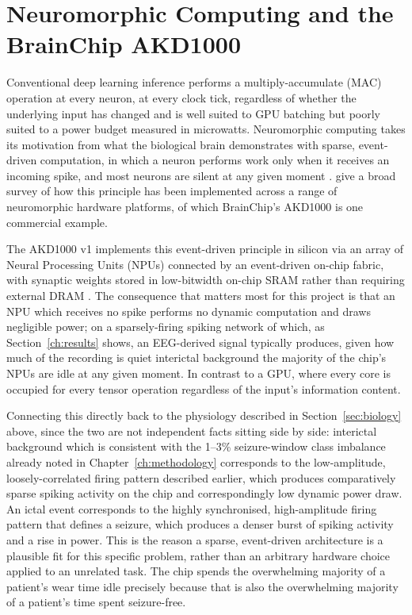 \section{Neuromorphic Computing and the BrainChip AKD1000}

Conventional deep learning inference performs a multiply-accumulate (MAC) operation at every neuron, at every clock tick, regardless of whether the underlying input has changed and is well suited to GPU batching but poorly suited to a power budget measured in microwatts. Neuromorphic computing takes its motivation from what the biological brain demonstrates with sparse, event-driven computation, in which a neuron performs work only when it receives an incoming spike, and most neurons are silent at any given moment \citep{mead1990}. \citet{schuman2017} give a broad survey of how this principle has been implemented across a range of neuromorphic hardware platforms, of which BrainChip's AKD1000 is one commercial example.

The AKD1000 v1 implements this event-driven principle in silicon via an array of Neural Processing Units (NPUs) connected by an event-driven on-chip fabric, with synaptic weights stored in low-bitwidth on-chip SRAM rather than requiring external DRAM \citep{brainchip_akida_whitepaper, brainchip_akd1000_productbrief}. The consequence that matters most for this project is that an NPU which receives no spike performs no dynamic computation and draws negligible power; on a sparsely-firing spiking network of which, as Section~\ref{ch:results} shows, an EEG-derived signal typically produces, given how much of the recording is quiet interictal background the majority of the chip's NPUs are idle at any given moment. In contrast to a GPU, where every core is occupied for every tensor operation regardless of the input's information content.

Connecting this directly back to the physiology described in Section~\ref{sec:biology} above, since the two are not independent facts sitting side by side: interictal background which is consistent with the 1--3\% seizure-window class imbalance already noted in Chapter~\ref{ch:methodology} corresponds to the low-amplitude, loosely-correlated firing pattern described earlier, which produces comparatively sparse spiking activity on the chip and correspondingly low dynamic power draw. An ictal event corresponds to the highly synchronised, high-amplitude firing pattern that defines a seizure, which produces a denser burst of spiking activity and a rise in power. This is the reason a sparse, event-driven architecture is a plausible fit for this specific problem, rather than an arbitrary hardware choice applied to an unrelated task. The chip spends the overwhelming majority of a patient's wear time idle precisely because that is also the overwhelming majority of a patient's time spent seizure-free.

